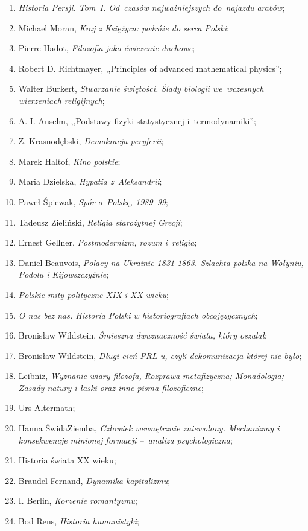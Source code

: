 \documentclass[a4paper,11pt]{article}
\begin{document}
\begin{enumerate}
\item \emph{Historia Persji. Tom~I. Od~czasów najważniejszych
    do~najazdu arabów};
\item Michael Moran, \emph{Kraj z Księżyca: podróże do serca Polski};
\item Pierre Hadot, \emph{Filozofia jako ćwiczenie duchowe};
\item Robert D. Richtmayer, ,,Principles of advanced mathematical
  physics'';
\item Walter Burkert, \emph{Stwarzanie świętości. Ślady biologii
    we~wczesnych wierzeniach religijnych};
\item A. I. Anselm, ,,Podstawy fizyki statystycznej i~termodynamiki'';
\item Z. Krasnodębski, \emph{Demokracja peryferii};
\item Marek Haltof, \emph{Kino polskie};
\item Maria Dzielska, \emph{Hypatia z~Aleksandrii};
\item Paweł Śpiewak, \emph{Spór o~Polskę, 1989--99};
\item Tadeusz Zieliński, \emph{Religia starożytnej Grecji};
\item Ernest Gellner, \emph{Postmodernizm, rozum i~religia};
\item Daniel Beauvois, \emph{Polacy na Ukrainie 1831-1863. Szlachta
    polska na Wołyniu, Podolu i Kijowszczyźnie};
\item \emph{Polskie mity polityczne XIX i XX wieku};
\item \emph{O nas bez nas. Historia Polski w historiografiach
    obcojęzycznych};
\item Bronisław Wildstein, \emph{Śmieszna dwuznaczność świata, który
    oszalał};
\item Bronisław Wildstein, \emph{Długi cień PRL-u, czyli dekomunizacja
    której nie było};
\item Leibniz, \emph{Wyznanie wiary filozofa, Rozprawa metafizyczna;
    Monadologia; Zasady natury i łaski oraz inne pisma filozoficzne};
\item Urs Altermath;
\item Hanna Świda\dywiz Ziemba, \emph{Człowiek wewnętrznie zniewolony.
    Mechanizmy i konsekwencje minionej formacji --~analiza
    psychologiczna};
\item Historia świata XX wieku;
\item Braudel Fernand, \emph{Dynamika kapitalizmu};
\item I. Berlin, \emph{Korzenie romantyzmu};
\item Bod Rens, \emph{Historia humanistyki};

\end{enumerate}
\end{document}
